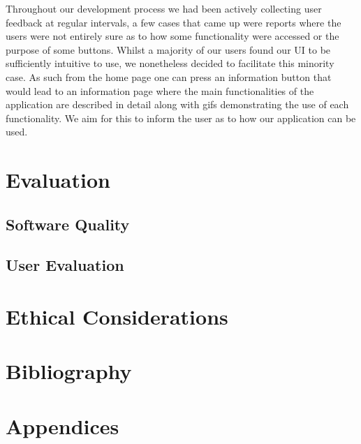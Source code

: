 \documentclass[a4paper, 11pt]{article}
\begin{document}
      Throughout our development process we had been actively collecting user
      feedback at regular intervals, a few cases that came up were reports where
      the users were not entirely sure as to how some functionality were
      accessed or the purpose of some buttons. Whilst a majority of our users
      found our UI to be sufficiently intuitive to use, we nonetheless decided
      to facilitate this minority case.
      \newline\newline
      As such from the home page one can press an information button that would
      lead to an information page where the main functionalities of the
      application are described in detail along with gifs demonstrating the use
      of each functionality. We aim for this to inform the user as to how our
      application can be used.

  \section{Evaluation}
    \subsection{Software Quality}
    \subsection{User Evaluation}


  \section{Ethical Considerations}

  \section{Bibliography}
  
  

  \appendix
  \section{Appendices}
\end{document}
